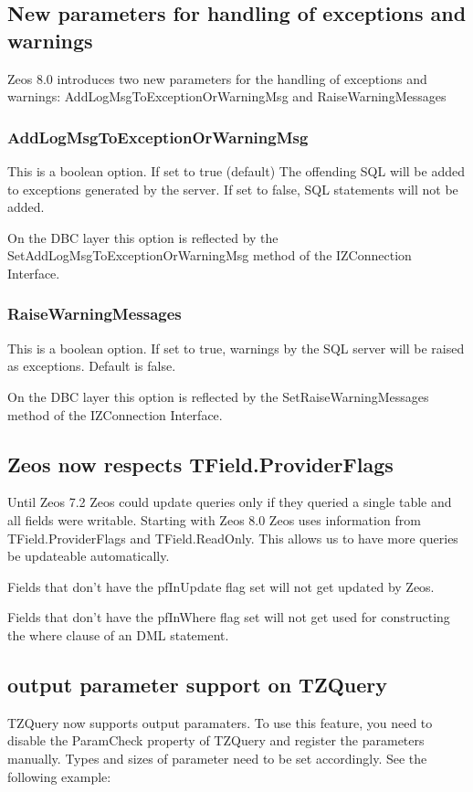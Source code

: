 \documentclass[a4paper,12pt,oneside]{report}
\begin{document}
\subsection{New parameters for handling of exceptions and warnings}
Zeos 8.0 introduces two new parameters for the handling of exceptions and warnings:
AddLogMsgToExceptionOrWarningMsg and RaiseWarningMessages

\subsubsection{AddLogMsgToExceptionOrWarningMsg }
This is a boolean option.
If set to true (default) The offending SQL will be added to exceptions generated by the server.
If set to false, SQL statements will not be added.

On the DBC layer this option is reflected by the SetAddLogMsgToExceptionOrWarningMsg method of the IZConnection Interface.

\subsubsection{RaiseWarningMessages}
This is a boolean option.
If set to true, warnings by the SQL server will be raised as exceptions.
Default is false.

On the DBC layer this option is reflected by the SetRaiseWarningMessages method of the IZConnection Interface.

\subsection{Zeos now respects TField.ProviderFlags}
Until Zeos 7.2 Zeos could update queries only if they queried a single table and all fields were writable.
Starting with Zeos 8.0 Zeos uses information from TField.ProviderFlags and TField.ReadOnly.
This allows us to have more queries be updateable automatically.

Fields that don't have the pfInUpdate flag set will not get updated by Zeos.

Fields that don't have the pfInWhere flag set will not get used for constructing the where clause of an DML statement.

\subsection{output parameter support on TZQuery}
TZQuery now supports output paramaters.
To use this feature, you need to disable the ParamCheck property of TZQuery and register the parameters manually.
Types and sizes of parameter need to be set accordingly.
See the following example:
\end{document}
